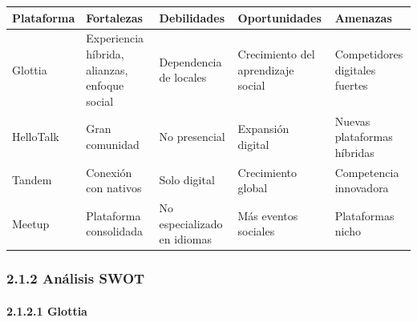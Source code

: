 {\def\LTcaptype{none} %
\begin{longtable}[]{@{}
  >{\raggedright\arraybackslash}p{}
  >{\raggedright\arraybackslash}p{}
  >{\raggedright\arraybackslash}p{}
  >{\raggedright\arraybackslash}p{}
  >{\raggedright\arraybackslash}p{}@{}}
\toprule\noalign{}
\begin{minipage}[b]{\linewidth}\raggedright
Plataforma
\end{minipage} & \begin{minipage}[b]{\linewidth}\raggedright
Fortalezas
\end{minipage} & \begin{minipage}[b]{\linewidth}\raggedright
Debilidades
\end{minipage} & \begin{minipage}[b]{\linewidth}\raggedright
Oportunidades
\end{minipage} & \begin{minipage}[b]{\linewidth}\raggedright
Amenazas
\end{minipage} \\
\midrule\noalign{}
\endhead
\bottomrule\noalign{}
\endlastfoot
Glottia & Experiencia híbrida, alianzas, enfoque social & Dependencia de
locales & Crecimiento del aprendizaje social & Competidores digitales
fuertes \\
HelloTalk & Gran comunidad & No presencial & Expansión digital & Nuevas
plataformas híbridas \\
Tandem & Conexión con nativos & Solo digital & Crecimiento global &
Competencia innovadora \\
Meetup & Plataforma consolidada & No especializado en idiomas & Más
eventos sociales & Plataformas nicho \\
\end{longtable}
}

\subsubsection{2.1.2 Análisis
SWOT}\label{report__20-cap2-requirements-analysis.md__anuxe1lisis-swot-1}

\paragraph{2.1.2.1
Glottia}\label{report__20-cap2-requirements-analysis.md__glottia}

